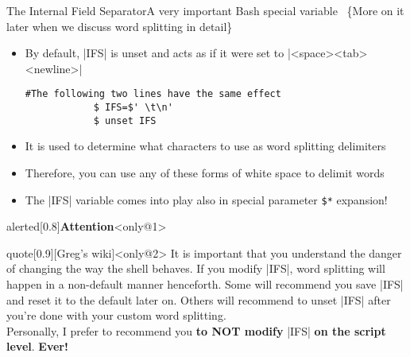 \begin{frame}[fragile]{The Internal Field Separator}{A very important Bash special variable {\tiny~\{More on it later when we discuss word splitting in detail\}}}
    \vspace{-3mm}
    \begin{itemize}
        \item By default, \bash|IFS| is unset and acts as if it were set to \bash|<space><tab><newline>|
        \begin{lstlisting}[style=MyBash, numbers=none, xrightmargin=15mm, belowskip=-6mm, aboveskip=2mm]
            #The following two lines have the same effect
            $ IFS=$' \t\n'
            $ unset IFS
        \end{lstlisting}
        \item It is used to determine what characters to use as word splitting delimiters
        \item Therefore, you can use any of these forms of white space to delimit words
        \item The \bash|IFS| variable comes into play also in special parameter \texttt{\$*} expansion!
    \end{itemize}
    \vspace{-5mm}
    \begin{overlayarea}{\textwidth}{0.35\textheight}
        \begin{varblock}{alerted}[0.8\textwidth]{\Large \textbf{Attention}}<only@1>
        \end{varblock}
        \begin{varblock}{quote}[0.9\textwidth]{}[Greg's wiki]<only@2>
            It is important that you understand the danger of changing the way the shell behaves.
            If you modify \textnormal{\bash|IFS|}, word splitting will happen in a non-default manner henceforth.
            Some will recommend you save \textnormal{\bash|IFS|} and reset it to the default later on.
            Others will recommend to unset \textnormal{\bash|IFS|} after you're done with your custom word splitting.\\
            Personally, I prefer to recommend you \textbf{to NOT modify} \textnormal{\bash|IFS|} \textbf{on the script level}.
            \alert{\textbf{Ever!}}\\[-0.7em] ~
        \end{varblock}
    \end{overlayarea}
\end{frame}

